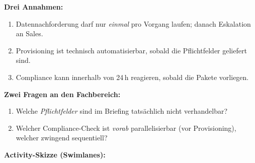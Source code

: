 \documentclass[11pt,a4paper,oneside]{article}
\begin{document}
\begin{loesungbox}
\smallskip
\textbf{Drei Annahmen:}
\begin{enumerate}
  \item Daten\-nachforderung darf nur \emph{einmal} pro Vorgang laufen; danach Eskalation an Sales.
  \item Provisioning ist technisch automatisierbar, sobald die Pflichtfelder geliefert sind.
  \item Compliance kann innerhalb von 24\,h reagieren, sobald die Pakete vorliegen.
\end{enumerate}

\smallskip
\textbf{Zwei Fragen an den Fachbereich:}
\begin{enumerate}
  \item Welche \emph{Pflichtfelder} sind im Briefing tats\"achlich nicht verhandelbar?
  \item Welcher Compliance-Check ist \emph{vorab} parallelisierbar (vor Provisioning), welcher zwingend sequentiell?
\end{enumerate}

\smallskip
\textbf{Activity-Skizze (Swimlanes):}


\end{loesungbox}
\end{document}
